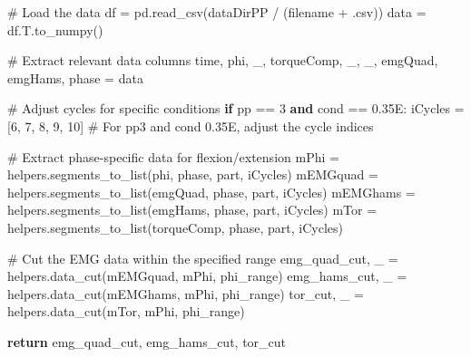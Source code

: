 \documentclass[
  11pt,
  a4paper]{article}
\newenvironment{Shaded}{\begin{snugshade}}{\end{snugshade}}
\newcommand{\CommentTok}[1]{\textcolor[rgb]{0.37,0.37,0.37}{#1}}
\newcommand{\ControlFlowTok}[1]{\textcolor[rgb]{0.00,0.23,0.31}{\textbf{#1}}}
\newcommand{\DecValTok}[1]{\textcolor[rgb]{0.68,0.00,0.00}{#1}}
\newcommand{\KeywordTok}[1]{\textcolor[rgb]{0.00,0.23,0.31}{\textbf{#1}}}
\newcommand{\NormalTok}[1]{\textcolor[rgb]{0.00,0.23,0.31}{#1}}
\newcommand{\OperatorTok}[1]{\textcolor[rgb]{0.37,0.37,0.37}{#1}}
\newcommand{\StringTok}[1]{\textcolor[rgb]{0.13,0.47,0.30}{#1}}
\begin{document}
\begin{Shaded}
\begin{Highlighting}[]
    \CommentTok{\# Load the data}
\NormalTok{    df }\OperatorTok{=}\NormalTok{ pd.read\_csv(dataDirPP }\OperatorTok{/}\NormalTok{ (filename }\OperatorTok{+} \StringTok{\textquotesingle{}.csv\textquotesingle{}}\NormalTok{))}
\NormalTok{    data }\OperatorTok{=}\NormalTok{ df.T.to\_numpy()}
    
    \CommentTok{\# Extract relevant data columns}
\NormalTok{    time, phi, \_, torqueComp, \_, \_, emgQuad, emgHams, phase }\OperatorTok{=}\NormalTok{ data}

    \CommentTok{\# Adjust cycles for specific conditions}
    \ControlFlowTok{if}\NormalTok{ pp }\OperatorTok{==} \DecValTok{3} \KeywordTok{and}\NormalTok{ cond }\OperatorTok{==} \StringTok{\textquotesingle{}0.35E\textquotesingle{}}\NormalTok{:}
\NormalTok{        iCycles }\OperatorTok{=}\NormalTok{ [}\DecValTok{6}\NormalTok{, }\DecValTok{7}\NormalTok{, }\DecValTok{8}\NormalTok{, }\DecValTok{9}\NormalTok{, }\DecValTok{10}\NormalTok{]  }\CommentTok{\# For pp3 and cond 0.35E, adjust the cycle indices}

    \CommentTok{\# Extract phase{-}specific data for flexion/extension}
\NormalTok{    mPhi        }\OperatorTok{=}\NormalTok{ helpers.segments\_to\_list(phi, phase, part, iCycles)}
\NormalTok{    mEMGquad    }\OperatorTok{=}\NormalTok{ helpers.segments\_to\_list(emgQuad, phase, part, iCycles)}
\NormalTok{    mEMGhams    }\OperatorTok{=}\NormalTok{ helpers.segments\_to\_list(emgHams, phase, part, iCycles)}
\NormalTok{    mTor        }\OperatorTok{=}\NormalTok{ helpers.segments\_to\_list(torqueComp, phase, part, iCycles)}

    \CommentTok{\# Cut the EMG data within the specified range}
\NormalTok{    emg\_quad\_cut, \_ }\OperatorTok{=}\NormalTok{ helpers.data\_cut(mEMGquad, mPhi, phi\_range)}
\NormalTok{    emg\_hams\_cut, \_ }\OperatorTok{=}\NormalTok{ helpers.data\_cut(mEMGhams, mPhi, phi\_range)}
\NormalTok{    tor\_cut, \_      }\OperatorTok{=}\NormalTok{ helpers.data\_cut(mTor, mPhi, phi\_range) }

    \ControlFlowTok{return}\NormalTok{ emg\_quad\_cut, emg\_hams\_cut, tor\_cut}


\end{Highlighting}
\end{Shaded}
\end{document}
